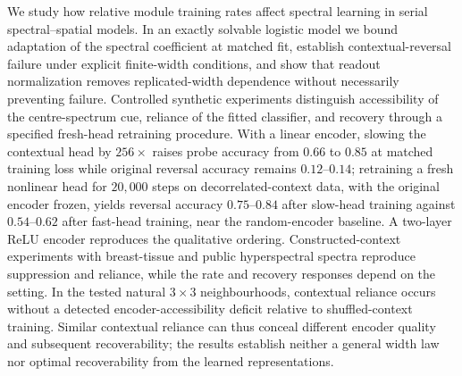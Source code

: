 We study how relative module training rates affect spectral learning in
serial spectral--spatial models. In an exactly solvable logistic model we bound adaptation
of the spectral coefficient at matched fit, establish contextual-reversal
failure under explicit finite-width conditions, and show that readout
normalization removes replicated-width dependence without necessarily
preventing failure. Controlled synthetic experiments distinguish
accessibility of the centre-spectrum cue, reliance of the fitted
classifier, and recovery through a specified fresh-head retraining
procedure. With a linear encoder, slowing the contextual head by
$256\times$ raises probe accuracy from $0.66$ to $0.85$ at matched
training loss while original reversal accuracy remains $0.12$--$0.14$;
retraining a fresh nonlinear head for $20{,}000$ steps on
decorrelated-context data, with the original encoder frozen, yields
reversal accuracy $0.75$--$0.84$ after slow-head training against
$0.54$--$0.62$ after fast-head training, near the random-encoder
baseline. A two-layer ReLU encoder reproduces the qualitative ordering.
Constructed-context experiments with breast-tissue and public
hyperspectral spectra reproduce suppression and reliance, while the rate
and recovery responses depend on the setting. In the tested natural
$3\times3$ neighbourhoods, contextual reliance occurs without a detected
encoder-accessibility deficit relative to shuffled-context training.
Similar contextual reliance can thus conceal different encoder quality
and subsequent recoverability; the results establish neither a general
width law nor optimal recoverability from the learned representations.
